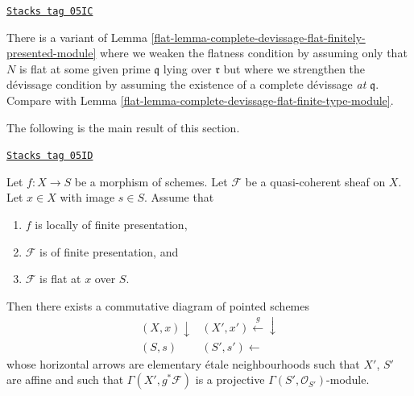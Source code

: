 \begin{remark}
\label{flat-remark-complete-devissage-flat-finitely-presented-module}
\href{https://stacks.math.columbia.edu/tag/05IC}{\texttt{Stacks tag 05IC}}

There is a variant of
Lemma \ref{flat-lemma-complete-devissage-flat-finitely-presented-module}
where we weaken the flatness condition by assuming only that $N$
is flat at some given prime $\mathfrak q$ lying over $\mathfrak r$
but where we strengthen the d\'evissage condition by assuming
the existence of a complete d\'evissage {\it at $\mathfrak q$}. Compare with
Lemma \ref{flat-lemma-complete-devissage-flat-finite-type-module}.
\end{remark}

The following is the main result of this section.

\begin{proposition}
\label{flat-proposition-finite-presentation-flat-at-point}
\href{https://stacks.math.columbia.edu/tag/05ID}{\texttt{Stacks tag 05ID}}

Let $f : X \to S$ be a morphism of schemes.
Let $\mathcal{F}$ be a quasi-coherent sheaf on $X$.
Let $x \in X$ with image $s \in S$.
Assume that
\begin{enumerate}
\item $f$ is locally of finite presentation,
\item $\mathcal{F}$ is of finite presentation, and
\item $\mathcal{F}$ is flat at $x$ over $S$.
\end{enumerate}
Then there exists a commutative diagram of pointed schemes
$$
\begin{array}{cc}(X, x) \downarrow & (X', x') \overset{g}{\longleftarrow}\downarrow \\ (S, s) & (S', s') \longleftarrow\end{array}
$$
whose horizontal arrows are elementary \'etale neighbourhoods
such that $X'$, $S'$ are affine and such that
$\Gamma(X', g^*\mathcal{F})$ is a projective
$\Gamma(S', \mathcal{O}_{S'})$-module.
\end{proposition}

